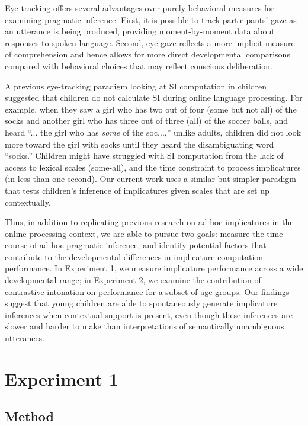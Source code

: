 \documentclass[10pt,letterpaper]{article}
\begin{document}
Eye-tracking offers several advantages over purely behavioral measures for examining pragmatic inference. First, it is possible to track participants' gaze as an utterance is being produced, providing moment-by-moment data about responses to spoken language. Second, eye gaze reflects a more implicit measure of comprehension and hence allows for more direct developmental comparisons compared with behavioral choices that may reflect conscious deliberation. 

A previous eye-tracking paradigm looking at SI computation in children \cite{huang2009semantic} suggested that children do not calculate SI during online language processing. For example, when they saw a girl who has two out of four (some but not all) of the socks and another girl who has three out of three (all) of the soccer balls, and heard ``... the girl who has \emph{some} of the soc...,'' unlike adults, children did not look more toward the girl with socks until they heard the disambiguating word ``socks.'' Children might have struggled with SI computation from the lack of access to lexical scales (some-all), and the time constraint to process implicatures (in less than one second). Our current work uses a similar but simpler paradigm that tests children's inference of implicatures given scales that are set up contextually.

Thus, in addition to replicating previous research on ad-hoc implicatures in the online processing context, we are able to pursue two goals: measure the time-course of ad-hoc pragmatic inference; and identify potential factors that contribute to the developmental differences in implicature computation performance. In Experiment 1, we measure implicature performance across a wide developmental range; in Experiment 2, we examine the contribution of contrastive intonation on performance for a subset of age groups. Our findings suggest that young children are able to spontaneously generate implicature inferences when contextual support is present, even though these inferences are slower and harder to make than interpretations of semantically unambiguous utterances.

\section{Experiment 1}

\subsection{Method}
\end{document}
